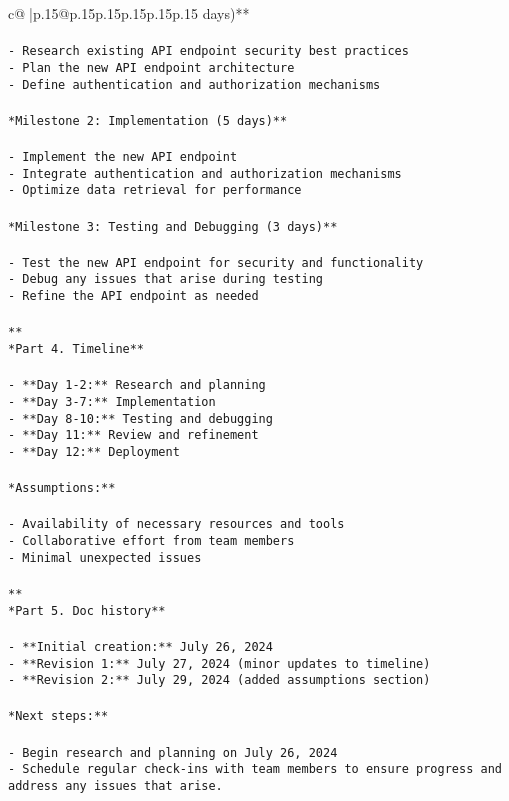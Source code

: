 \documentclass{article}
\begin{document}
{\begin{supertabular}{c@{$\;$}|p{.15\linewidth}@{}p{.15\linewidth}p{.15\linewidth}p{.15\linewidth}p{.15\linewidth}p{.15\linewidth}}
{{{days)**\\ \tt \\ \tt - Research existing API endpoint security best practices\\ \tt - Plan the new API endpoint architecture\\ \tt - Define authentication and authorization mechanisms\\ \tt \\ \tt **Milestone 2: Implementation (5 days)**\\ \tt \\ \tt - Implement the new API endpoint\\ \tt - Integrate authentication and authorization mechanisms\\ \tt - Optimize data retrieval for performance\\ \tt \\ \tt **Milestone 3: Testing and Debugging (3 days)**\\ \tt \\ \tt - Test the new API endpoint for security and functionality\\ \tt - Debug any issues that arise during testing\\ \tt - Refine the API endpoint as needed\\ \tt \\ \tt ***\\ \tt **Part 4. Timeline**\\ \tt \\ \tt - **Day 1-2:** Research and planning\\ \tt - **Day 3-7:** Implementation\\ \tt - **Day 8-10:** Testing and debugging\\ \tt - **Day 11:** Review and refinement\\ \tt - **Day 12:** Deployment\\ \tt \\ \tt **Assumptions:**\\ \tt \\ \tt - Availability of necessary resources and tools\\ \tt - Collaborative effort from team members\\ \tt - Minimal unexpected issues\\ \tt \\ \tt ***\\ \tt **Part 5. Doc history**\\ \tt \\ \tt - **Initial creation:** July 26, 2024\\ \tt - **Revision 1:** July 27, 2024 (minor updates to timeline)\\ \tt - **Revision 2:** July 29, 2024 (added assumptions section)\\ \tt \\ \tt **Next steps:**\\ \tt \\ \tt - Begin research and planning on July 26, 2024\\ \tt - Schedule regular check-ins with team members to ensure progress and address any issues that arise. 
}}}
\end{supertabular}}
\end{document}
